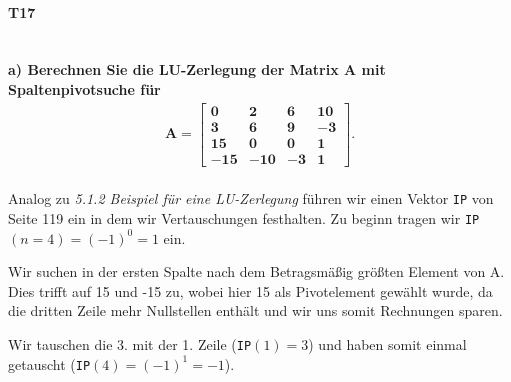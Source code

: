\documentclass[10pt,a4paper]{article}
\begin{document}
	\newpage
	\paragraph{T17}\mbox{}\\
	\textbf{%
		a) Berechnen Sie die LU-Zerlegung der Matrix A mit Spaltenpivotsuche für
		\begin{align*}\mathbf{
			A= \begin{bmatrix}
				0   & 2   & 6  & 10 \\
				3   & 6   & 9  & -3 \\
				15  & 0   & 0  & 1  \\
				-15 & -10 & -3 & 1
			\end{bmatrix}.}
		\end{align*}
	}\\
    Analog zu \emph{5.1.2 Beispiel für eine LU-Zerlegung} führen wir einen Vektor \texttt{IP} von Seite 119 ein in dem wir Vertauschungen festhalten. Zu beginn tragen wir \texttt{IP}$(n=4)=(-1)^0=1$ ein.
    
    Wir suchen in der ersten Spalte nach dem Betragsmäßig größten Element von A. Dies trifft auf 15 und -15 zu, wobei hier 15 als Pivotelement gewählt wurde, da die dritten Zeile mehr Nullstellen enthält und wir uns somit Rechnungen sparen.
    
    Wir tauschen die 3. mit der 1. Zeile (\texttt{IP}$(1)=3$) und haben somit einmal getauscht (\texttt{IP}$(4)=(-1)^1=-1$).
    
\end{document}
